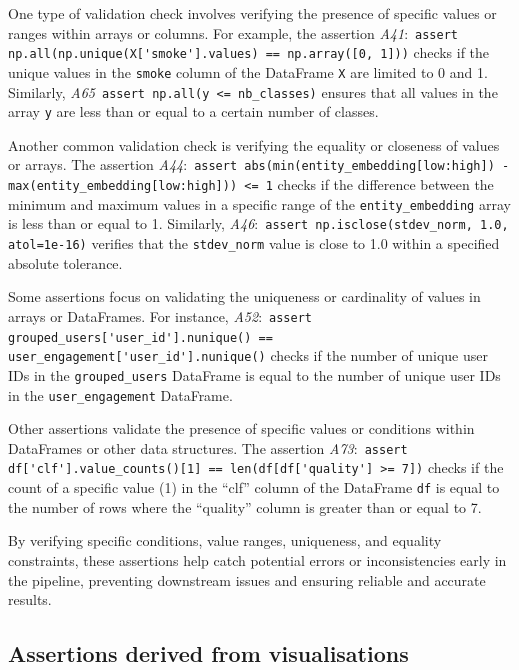 One type of validation check involves verifying the presence of specific values or ranges within arrays or columns. For example, the assertion \emph{A41}:~\lstinline{assert np.all(np.unique(X['smoke'].values) == np.array([0, 1]))} checks if the unique values in the \texttt{smoke} column of the DataFrame \texttt{X} are limited to 0 and 1. Similarly, \emph{A65}~\lstinline{assert np.all(y <= nb_classes)} ensures that all values in the array \texttt{y} are less than or equal to a certain number of classes.

Another common validation check is verifying the equality or closeness of values or arrays. The assertion \emph{A44}:~\lstinline{assert abs(min(entity_embedding[low:high]) - max(entity_embedding[low:high])) <= 1} checks if the difference between the minimum and maximum values in a specific range of the \texttt{entity\_embedding} array is less than or equal to 1. Similarly, \emph{A46}:~\lstinline{assert np.isclose(stdev_norm, 1.0, atol=1e-16)} verifies that the \texttt{stdev\_norm} value is close to 1.0 within a specified absolute tolerance.

Some assertions focus on validating the uniqueness or cardinality of values in arrays or DataFrames. For instance, \emph{A52}:~\lstinline{assert grouped_users['user_id'].nunique() == user_engagement['user_id'].nunique()} checks if the number of unique user IDs in the \texttt{grouped\_users} DataFrame is equal to the number of unique user IDs in the \texttt{user\_engagement} DataFrame.

Other assertions validate the presence of specific values or conditions within DataFrames or other data structures. The assertion \emph{A73}:~\lstinline{assert df['clf'].value_counts()[1] == len(df[df['quality'] >= 7])} checks if the count of a specific value (1) in the ``clf'' column of the DataFrame \texttt{df} is equal to the number of rows where the ``quality'' column is greater than or equal to 7.

By verifying specific conditions, value ranges, uniqueness, and equality constraints, these assertions help catch potential errors or inconsistencies early in the pipeline, preventing downstream issues and ensuring reliable and accurate results.

\subsection{Assertions derived from visualisations}


